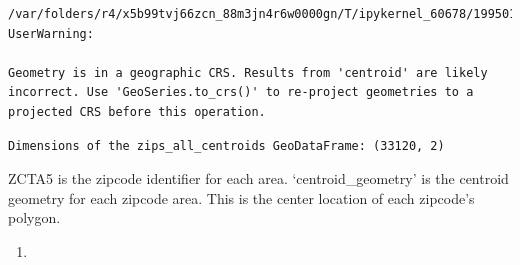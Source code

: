 \documentclass[
  letterpaper,
  DIV=11,
  numbers=noendperiod]{scrartcl}
\providecommand{\tightlist}{%
  \setlength{\itemsep}{0pt}\setlength{\parskip}{0pt}}\usepackage{longtable,booktabs,array}
\begin{document}
\begin{verbatim}
/var/folders/r4/x5b99tvj66zcn_88m3jn4r6w0000gn/T/ipykernel_60678/1995017425.py:2: UserWarning:

Geometry is in a geographic CRS. Results from 'centroid' are likely incorrect. Use 'GeoSeries.to_crs()' to re-project geometries to a projected CRS before this operation.

\end{verbatim}

\begin{verbatim}
Dimensions of the zips_all_centroids GeoDataFrame: (33120, 2)
\end{verbatim}

ZCTA5 is the zipcode identifier for each area. `centroid\_geometry' is
the centroid geometry for each zipcode area. This is the center location
of each zipcode's polygon.

\begin{enumerate}
\def\labelenumi{\arabic{enumi}.}
\setcounter{enumi}{1}
\tightlist
\item
\end{enumerate}
\end{document}
